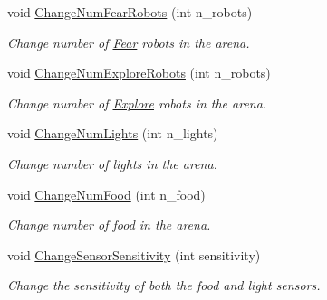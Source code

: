 \begin{DoxyCompactItemize}
\mbox{\label{class_controller_a9baedd1cbf0bd6fcb771ffda21fafc7b}} 
void \mbox{\hyperlink{class_controller_a9baedd1cbf0bd6fcb771ffda21fafc7b}{Change\+Num\+Fear\+Robots}} (int n\+\_\+robots)
\begin{DoxyCompactList}\small\item\em Change number of \mbox{\hyperlink{class_fear}{Fear}} robots in the arena. \end{DoxyCompactList}\item 
\mbox{\label{class_controller_a88ae74c37bc5d3ee2eef36d485ff65be}} 
void \mbox{\hyperlink{class_controller_a88ae74c37bc5d3ee2eef36d485ff65be}{Change\+Num\+Explore\+Robots}} (int n\+\_\+robots)
\begin{DoxyCompactList}\small\item\em Change number of \mbox{\hyperlink{class_explore}{Explore}} robots in the arena. \end{DoxyCompactList}\item 
\mbox{\label{class_controller_a9952d10da6fbc77b3726b7bb7b6c17d4}} 
void \mbox{\hyperlink{class_controller_a9952d10da6fbc77b3726b7bb7b6c17d4}{Change\+Num\+Lights}} (int n\+\_\+lights)
\begin{DoxyCompactList}\small\item\em Change number of lights in the arena. \end{DoxyCompactList}\item 
\mbox{\label{class_controller_a8bb2a21005f9dead1e847681be25044a}} 
void \mbox{\hyperlink{class_controller_a8bb2a21005f9dead1e847681be25044a}{Change\+Num\+Food}} (int n\+\_\+food)
\begin{DoxyCompactList}\small\item\em Change number of food in the arena. \end{DoxyCompactList}\item 
\mbox{\label{class_controller_aa6a4db6da624cb5509e745371ac5b8e1}} 
void \mbox{\hyperlink{class_controller_aa6a4db6da624cb5509e745371ac5b8e1}{Change\+Sensor\+Sensitivity}} (int sensitivity)
\begin{DoxyCompactList}\small\item\em Change the sensitivity of both the food and light sensors. \end{DoxyCompactList}\end{DoxyCompactItemize}


